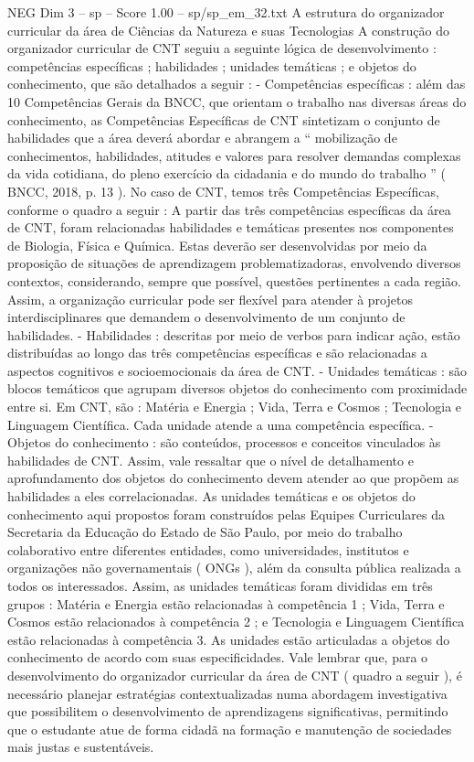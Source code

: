 \begin{textsample}{NEG Dim 3 – sp – Score 1.00 – sp/sp\_em\_32.txt}  \label{ex:f3_neg_082}
A estrutura do organizador curricular da área de Ciências da Natureza e suas Tecnologias A construção do organizador curricular de CNT seguiu a seguinte lógica de desenvolvimento : competências específicas ; habilidades ; unidades temáticas ; e objetos do conhecimento, que são detalhados a seguir : - Competências específicas : além das 10 Competências Gerais da BNCC, que orientam o trabalho nas diversas áreas do conhecimento, as Competências Específicas de CNT sintetizam o conjunto de habilidades que a área deverá abordar e abrangem a “ mobilização de conhecimentos, habilidades, atitudes e valores para resolver demandas complexas da vida cotidiana, do pleno exercício da cidadania e do mundo do trabalho ” ( BNCC, 2018, p. 13 ).
No caso de CNT, temos três Competências Específicas, conforme o quadro a seguir : A partir das três competências específicas da área de CNT, foram relacionadas habilidades e temáticas presentes nos componentes de Biologia, Física e Química.
Estas deverão ser desenvolvidas por meio da proposição de situações de aprendizagem problematizadoras, envolvendo diversos contextos, considerando, sempre que possível, questões pertinentes a cada região.
Assim, a organização curricular pode ser flexível para atender à projetos interdisciplinares que demandem o desenvolvimento de um conjunto de habilidades. - Habilidades : descritas por meio de verbos para indicar ação, estão distribuídas ao longo das três competências específicas e são relacionadas a aspectos cognitivos e socioemocionais da área de CNT. - Unidades temáticas : são blocos temáticos que agrupam diversos objetos do conhecimento com proximidade entre si.
Em CNT, são : Matéria e Energia ; Vida, Terra e Cosmos ; Tecnologia e Linguagem Científica.
Cada unidade atende a uma competência específica. - Objetos do conhecimento : são conteúdos, processos e conceitos vinculados às habilidades de CNT.
Assim, vale ressaltar que o nível de detalhamento e aprofundamento dos objetos do conhecimento devem atender ao que propõem as habilidades a eles correlacionadas.
As unidades temáticas e os objetos do conhecimento aqui propostos foram construídos pelas Equipes Curriculares da Secretaria da Educação do Estado de São Paulo, por meio do trabalho colaborativo entre diferentes entidades, como universidades, institutos e organizações não governamentais ( ONGs ), além da consulta pública realizada a todos os interessados.
Assim, as unidades temáticas foram divididas em três grupos : Matéria e Energia estão relacionadas à competência 1 ; Vida, Terra e Cosmos estão relacionados à competência 2 ; e Tecnologia e Linguagem Científica estão relacionadas à competência 3.
As unidades estão articuladas a objetos do conhecimento de acordo com suas especificidades.
Vale lembrar que, para o desenvolvimento do organizador curricular da área de CNT ( quadro a seguir ), é necessário planejar estratégias contextualizadas numa abordagem investigativa que possibilitem o desenvolvimento de aprendizagens significativas, permitindo que o estudante atue de forma cidadã na formação e manutenção de sociedades mais justas e sustentáveis.

\end{textsample}
